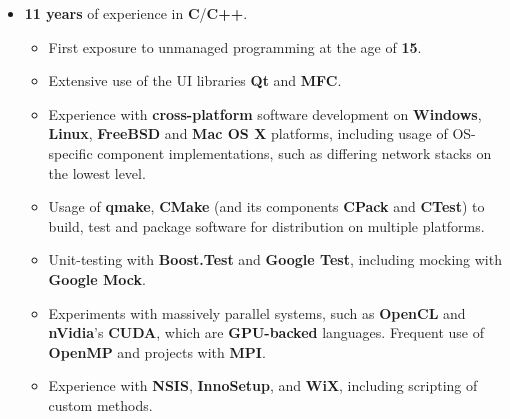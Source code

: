 \documentclass[11pt,a4paper,sans]{moderncv}
\begin{document}
	\vspace{7pt}

	\begin{itemize}
	\item	\label{softdevcpp}  \textbf{11 years} of experience in \textbf{C}/\textbf{C++}.
		\begin{itemize}
		\item	First exposure to unmanaged programming at the age of \textbf{15}.
		\item	Extensive use of the UI libraries \textbf{Qt} and \textbf{MFC}.
		\item	Experience with \textbf{cross-platform} software development on \textbf{Windows}, \textbf{Linux}, \textbf{FreeBSD} and \textbf{Mac OS X} platforms, including usage of OS-specific component implementations, such as differing network stacks on the lowest level.
		\item	Usage of \textbf{qmake}, \textbf{CMake} (and its components \textbf{CPack} and \textbf{CTest}) to build, test and package software for distribution on multiple platforms.
		\item	Unit-testing with \textbf{Boost.Test} and \textbf{Google Test}, including mocking with \textbf{Google Mock}.
		\item	Experiments with massively parallel systems, such as \textbf{OpenCL} and \textbf{nVidia}'s \textbf{CUDA}, which are \textbf{GPU-backed} languages. Frequent use of \textbf{OpenMP} and projects with \textbf{MPI}.
		\item	Experience with \textbf{NSIS}, \textbf{InnoSetup}, and \textbf{WiX}, including scripting of custom methods.
		\end{itemize}
	\end{itemize}

	\vspace{7pt}
\end{document}
